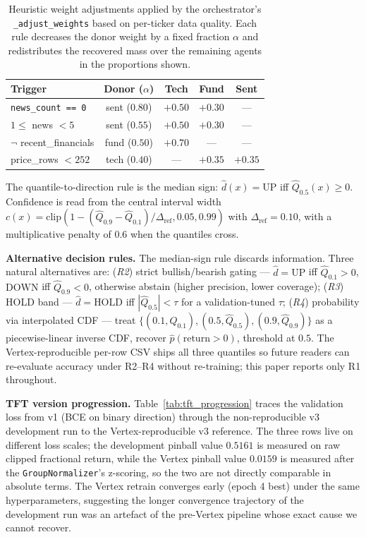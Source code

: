 \documentclass[conference]{IEEEtran}
\begin{document}
\begin{table}[htbp]
\centering
\caption{Heuristic weight adjustments applied by the orchestrator's \texttt{\_adjust\_weights} based on per-ticker data quality. Each rule decreases the donor weight by a fixed fraction $\alpha$ and redistributes the recovered mass over the remaining agents in the proportions shown.}
\label{tab:weight_adjustments}
\scriptsize
\setlength{\tabcolsep}{3pt}
\begin{tabular}{p{2.3cm}cccc}
\toprule
\textbf{Trigger} & \textbf{Donor ($\alpha$)} & \textbf{Tech} & \textbf{Fund} & \textbf{Sent} \\
\midrule
\texttt{news\_count == 0}              & sent ($0.80$) & $+0.50$ & $+0.30$ & ---     \\
$1 \le$ news $< 5$                     & sent ($0.55$) & $+0.50$ & $+0.30$ & ---     \\
$\neg$ recent\_financials              & fund ($0.50$) & $+0.70$ & ---     & ---     \\
price\_rows $< 252$                    & tech ($0.40$) & ---     & $+0.35$ & $+0.35$ \\
\bottomrule
\end{tabular}
\end{table}

The quantile-to-direction rule is the median sign: $\hat{d}(x) = \text{UP}$ iff $\hat{Q}_{0.5}(x) \geq 0$. Confidence is read from the central interval width $c(x) = \text{clip}(1 - (\hat{Q}_{0.9} - \hat{Q}_{0.1})/\Delta_\text{ref}, 0.05, 0.99)$ with $\Delta_\text{ref} = 0.10$, with a multiplicative penalty of $0.6$ when the quantiles cross.

\textbf{Alternative decision rules.} The median-sign rule discards information. Three natural alternatives are: (\textit{R2}) strict bullish/bearish gating --- $\hat{d}\!=\!\text{UP}$ iff $\hat{Q}_{0.1}\!>\!0$, $\text{DOWN}$ iff $\hat{Q}_{0.9}\!<\!0$, otherwise abstain (higher precision, lower coverage); (\textit{R3}) HOLD band --- $\hat{d}\!=\!\text{HOLD}$ iff $|\hat{Q}_{0.5}|\!<\!\tau$ for a validation-tuned $\tau$; (\textit{R4}) probability via interpolated CDF --- treat $\{(0.1, \hat{Q}_{0.1}), (0.5, \hat{Q}_{0.5}), (0.9, \hat{Q}_{0.9})\}$ as a piecewise-linear inverse CDF, recover $\hat{p}(\text{return}\!>\!0)$, threshold at $0.5$. The Vertex-reproducible per-row CSV ships all three quantiles so future readers can re-evaluate accuracy under R2--R4 without re-training; this paper reports only R1 throughout.

\textbf{TFT version progression.} Table~\ref{tab:tft_progression} traces the validation loss from v1 (BCE on binary direction) through the non-reproducible v3 development run to the Vertex-reproducible v3 reference. The three rows live on different loss scales; the development pinball value $0.5161$ is measured on raw clipped fractional return, while the Vertex pinball value $0.0159$ is measured after the \texttt{GroupNormalizer}'s z-scoring, so the two are not directly comparable in absolute terms. The Vertex retrain converges early (epoch 4 best) under the same hyperparameters, suggesting the longer convergence trajectory of the development run was an artefact of the pre-Vertex pipeline whose exact cause we cannot recover.
\end{document}
